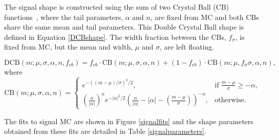 The signal shape is constructed using the sum of two Crystal Ball (CB) functions~\cite{Skwarnicki:1986xj}, where the tail parameters, $\alpha$ and $n$, are fixed from MC and both CBs share the same mean and tail parameters. This Double Crystal Ball shape is defined in Equation \ref{DCBshape}. The width fraction between the CBs, $f_{\sigma}$, is fixed from MC, but the mean and width, $\mu$ and $\sigma$, are left floating. 

\begin{equation}
\mathrm{DCB}(m; \mu,\sigma,\alpha,n,f_{cb}) = f_{cb} \cdot \mathrm{CB}(m; \mu,\sigma,\alpha,n) + (1-f_{cb}) \cdot \mathrm{CB}(m;\mu,f_{\sigma}\sigma,\alpha,n),
\label{DCBshape}
\end{equation}
where
\begin{equation*}
  \mathrm{CB}(m; \mu,\sigma,\alpha,n)=
\begin{cases}
    e^{-((m-\mu)/ \sigma)^2/2},                                   & \text{if } \frac{m-\mu}{\sigma} \geq - \alpha, \\
   \left ( \frac{n}{|\alpha|} \right ) ^n e^{-|\alpha|^2/2} \left ( \frac{n}{|\alpha|} - |\alpha| - \left ( \frac{m-\mu}{\sigma} \right ) \right ) ^{-n} ,    & \text{otherwise.}
\end{cases}
\end{equation*}


The fits to signal MC are shown in Figure \ref{signalfits} and the shape parameters obtained from these fits are detailed in Table \ref{signalparameters}. 

